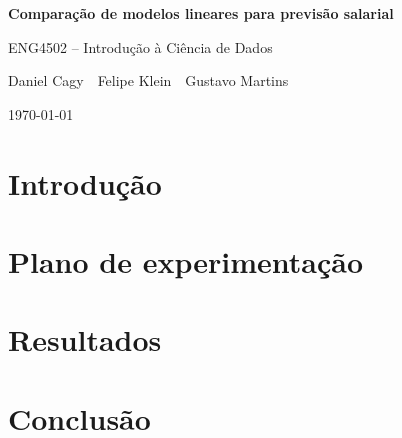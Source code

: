 \documentclass[12pt,a4paper]{article}
\newcommand{\reporttitle}{Comparação de modelos lineares para previsão salarial}
\newcommand{\reportsubtitle}{ENG4502 -- Introdução à Ciência de Dados}
\newcommand{\reportauthors}{Daniel Cagy \,\textperiodcentered\, Felipe Klein \,\textperiodcentered\, Gustavo Martins}
\begin{document}
\begin{titlepage}
  \thispagestyle{empty}
  \centering
  \vspace*{0.27\textheight}
  {\sffamily\fontsize{26}{31}\selectfont\bfseries\reporttitle\par}
  \vspace{0.6cm}
  {\large\reportsubtitle\par}
  \vfill
  {\normalsize\reportauthors\par}
  \vspace{0.8cm}
  {\small\today\par}
  \vspace*{1.5cm}
\end{titlepage}

\tableofcontents
\clearpage

\section{Introdução}


\section{Plano de experimentação}


\section{Resultados}


\section{Conclusão}

\end{document}

